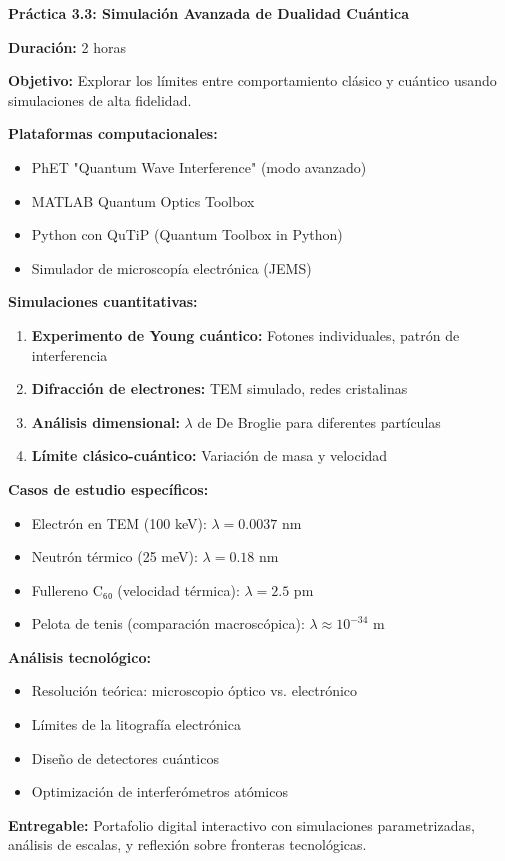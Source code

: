 \begin{practicabox}
	\textbf{Práctica 3.3: Simulación Avanzada de Dualidad Cuántica}
	
	\textbf{Duración:} 2 horas
	
	\textbf{Objetivo:} Explorar los límites entre comportamiento clásico y cuántico usando simulaciones de alta fidelidad.
	
	\textbf{Plataformas computacionales:}
	\begin{itemize}
		\item PhET "Quantum Wave Interference" (modo avanzado)
		\item MATLAB Quantum Optics Toolbox
		\item Python con QuTiP (Quantum Toolbox in Python)
		\item Simulador de microscopía electrónica (JEMS)
	\end{itemize}
	
	\textbf{Simulaciones cuantitativas:}
	\begin{enumerate}
		\item \textbf{Experimento de Young cuántico:} Fotones individuales, patrón de interferencia
		\item \textbf{Difracción de electrones:} TEM simulado, redes cristalinas
		\item \textbf{Análisis dimensional:} $\lambda$ de De Broglie para diferentes partículas
		\item \textbf{Límite clásico-cuántico:} Variación de masa y velocidad
	\end{enumerate}
	
	\textbf{Casos de estudio específicos:}
	\begin{itemize}
		\item Electrón en TEM (100 keV): $\lambda = 0.0037$ nm
		\item Neutrón térmico (25 meV): $\lambda = 0.18$ nm  
		\item Fullereno C₆₀ (velocidad térmica): $\lambda = 2.5$ pm
		\item Pelota de tenis (comparación macroscópica): $\lambda \approx 10^{-34}$ m
	\end{itemize}
	
	\textbf{Análisis tecnológico:}
	\begin{itemize}
		\item Resolución teórica: microscopio óptico vs. electrónico
		\item Límites de la litografía electrónica
		\item Diseño de detectores cuánticos
		\item Optimización de interferómetros atómicos
	\end{itemize}
	
	\textbf{Entregable:} Portafolio digital interactivo con simulaciones parametrizadas, análisis de escalas, y reflexión sobre fronteras tecnológicas.
\end{practicabox}

